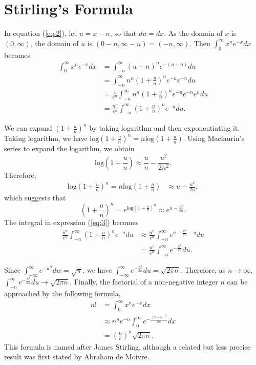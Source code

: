\documentclass[12pt,oneside,english,american,flalign]{book}\usepackage[]{graphicx}\usepackage[]{color}
\begin{document}
\section{Stirling's Formula}

\noindent In equation (\ref{eq:2}), let $u=x-n$, so that $du=dx$.
As the domain of $x$ is $\left(0,\infty\right)$, the domain of $u$
is $\left(0-n,\infty-n\right)=\left(-n,\infty\right)$. Then $\int_{0}^{\infty}x^{n}e^{-x}dx$
becomes 
\begin{align}
\int_{0}^{\infty}x^{n}e^{-x}dx & =\int_{-n}^{\infty}\left(u+n\right)^{n}e^{-\left(u+n\right)}du\nonumber \\
 & =\int_{-n}^{\infty}n^{n}\left(1+\frac{u}{n}\right)^{n}e^{-u}e^{-n}du\nonumber \\
 & =\frac{1}{e^{n}}\int_{-n}^{\infty}n^{n}\left(1+\frac{u}{n}\right)^{n}e^{-u}e^{-n}e^{n}du\nonumber \\
 & =\frac{n^{n}}{e^{n}}\int_{-n}^{\infty}\left(1+\frac{u}{n}\right)^{n}e^{-u}du.\label{eq:3}
\end{align}

We can expand $\left(1+\frac{u}{n}\right)^{n}$ by taking logarithm
and then exponentiating it. Taking logarithm, we have $\textrm{log}\left(1+\frac{u}{n}\right)^{n}=n\textrm{log}\left(1+\frac{u}{n}\right)$.
Using Maclaurin's series to expand the logarithm, we obtain
\[
\textrm{log}\left(1+\frac{u}{n}\right)\approx\frac{u}{n}-\frac{u^{2}}{2n^{2}}.
\]
Therefore,
\begin{align*}
\textrm{log}\left(1+\frac{u}{n}\right)^{n}=n\textrm{log}\left(1+\frac{u}{n}\right) & \approx u-\frac{u^{2}}{2n},
\end{align*}
which suggests that
\[
\left(1+\frac{u}{n}\right)^{n}=e^{\textrm{log}\left(1+\frac{u}{n}\right)^{n}}\approx e^{u-\frac{u^{2}}{2n}}.
\]
The integral in expression (\ref{eq:3}) becomes
\begin{align*}
\frac{n^{n}}{e^{n}}\int_{-n}^{\infty}\left(1+\frac{u}{n}\right)^{n}e^{-u}du & \approx\frac{n^{n}}{e^{n}}\int_{-n}^{\infty}e^{u-\frac{u^{2}}{2n}-u}du\\
 & =\frac{n^{n}}{e^{n}}\int_{-n}^{\infty}e^{-\frac{u^{2}}{2n}}du.
\end{align*}

\noindent Since $\int_{-\infty}^{\infty}e^{-w^{2}}dw=\sqrt{\pi}$,
we have $\int_{-\infty}^{\infty}e^{-\frac{u^{2}}{2n}}du=\sqrt{2\pi n}$.
Therefore, as $n\rightarrow\infty$, $\int_{-n}^{\infty}e^{-\frac{u^{2}}{2n}}du\rightarrow\sqrt{2\pi n}.$
Finally, the factorial of a non-negative integer $n$ can be approached
by the following formula,
\begin{align*}
n! & =\int_{0}^{\infty}x^{n}e^{-x}dx\\
 & \approx n^{n}e^{-n}\int_{0}^{\infty}e^{-\frac{\left(x-n\right)^{2}}{2n}}dx\\
 & =\left(\frac{n}{e}\right)^{n}\sqrt{2\pi n}.
\end{align*}
This formula is named after James Stirling, although a related but
less precise result was first stated by Abraham de Moivre.
\end{document}
